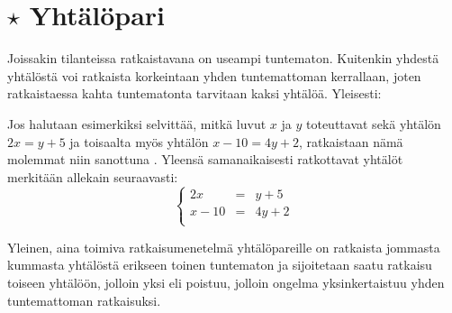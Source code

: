 \section*{$\star$ Yhtälöpari}

Joissakin tilanteissa ratkaistavana on useampi tuntematon. Kuitenkin yhdestä yhtälöstä voi ratkaista korkeintaan yhden tuntemattoman kerrallaan, joten ratkaistaessa kahta tuntematonta tarvitaan kaksi yhtälöä. Yleisesti:


Jos halutaan esimerkiksi selvittää, mitkä luvut $x$ ja $y$ toteuttavat sekä yhtälön $2x=y+5$ ja toisaalta 
myös yhtälön $x-10=4y+2$, ratkaistaan nämä molemmat niin sanottuna . Yleensä samanaikaisesti ratkottavat yhtälöt merkitään allekain seuraavasti:
$$\left\{    
    \begin{array}{rcl}
        2x&=&y+5 \\
        x-10&=&4y+2 \\
    \end{array}
    \right.$$

Yleinen, aina toimiva ratkaisumenetelmä yhtälöpareille on ratkaista jommasta kummasta yhtälöstä erikseen toinen tuntematon ja sijoitetaan saatu ratkaisu toiseen yhtälöön, jolloin yksi  eli poistuu, jolloin ongelma yksinkertaistuu yhden tuntemattoman ratkaisuksi.

